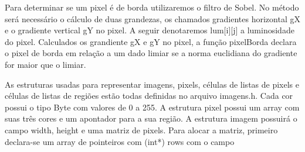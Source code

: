 \documentclass{article}
\begin{document}
Para determinar se um pixel é de borda utilizaremos o filtro de Sobel. No método será necessário o cálculo de duas
grandezas, os chamados gradientes horizontal gX e o gradiente vertical gY no pixel. A seguir denotaremos lum[i][j] a
luminosidade do pixel. Calculados os grandiente gX e gY no pixel, a função pixelBorda declara o pixel de borda em
relação a um dado limiar se a norma euclidiana do gradiente for maior que o limiar.


As estruturas usadas para representar imagens, pixels, células de listas de pixels e células de listas de regiões estão
todas definidas no arquivo imagens.h. Cada cor possui o tipo Byte com valores de 0 a 255. A estrutura pixel possui um
array com suas três cores e um apontador para a sua região. A estrutura imagem possuirá o campo width, height e uma
matriz de pixels. Para alocar a matriz, primeiro declara-se um array de pointeiros com (int*) rows com o campo 
\end{document}
